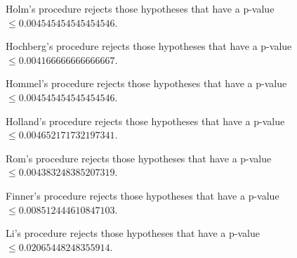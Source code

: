\documentclass[a4paper,10pt]{article}
\begin{document}
\begin{landscape}
Holm's procedure rejects those hypotheses that have a p-value $\le0.004545454545454546$.


Hochberg's procedure rejects those hypotheses that have a p-value $\le0.004166666666666667$.


Hommel's procedure rejects those hypotheses that have a p-value $\le0.004545454545454546$.


Holland's procedure rejects those hypotheses that have a p-value $\le0.004652171732197341$.


Rom's procedure rejects those hypotheses that have a p-value $\le0.004383248385207319$.


Finner's procedure rejects those hypotheses that have a p-value $\le0.008512444610847103$.


Li's procedure rejects those hypotheses that have a p-value $\le0.02065448248355914$.



\newpage


\end{landscape}
\end{document}
